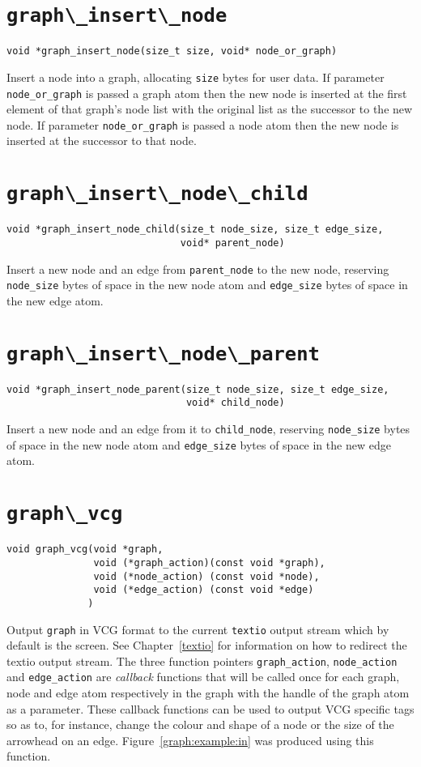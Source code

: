\section{\protect\verb+graph\_insert\_node+}
\begin{verbatim}
void *graph_insert_node(size_t size, void* node_or_graph)
\end{verbatim}
Insert a node into a graph, allocating {\tt size} bytes for user data. If
parameter \verb+node_or_graph+ is passed a graph atom then the new node is
inserted at the first element of that graph's node list with the original
list as the successor to the new node. If parameter \verb+node_or_graph+
is passed a node atom then the new node is inserted at the successor to
that node.

\section{\protect\verb+graph\_insert\_node\_child+}
\begin{verbatim}
void *graph_insert_node_child(size_t node_size, size_t edge_size, 
                              void* parent_node)
\end{verbatim}
Insert a new node and an edge from \verb+parent_node+ to the new node, reserving
\verb+node_size+ bytes of space in the new node atom and \verb+edge_size+ bytes of space
in the new edge atom.

\section{\protect\verb+graph\_insert\_node\_parent+}
\begin{verbatim}
void *graph_insert_node_parent(size_t node_size, size_t edge_size, 
                               void* child_node)
\end{verbatim}
Insert a new node and an edge from it to \verb+child_node+, reserving
\verb+node_size+ bytes of space in the new node atom and \verb+edge_size+ bytes of space
in the new edge atom.


\section{\protect\verb+graph\_vcg+}
\begin{verbatim}
void graph_vcg(void *graph,
               void (*graph_action)(const void *graph), 
               void (*node_action) (const void *node),
               void (*edge_action) (const void *edge)
              )
\end{verbatim}
Output {\tt graph} in VCG format to the current {\tt textio} output
stream which by default is the screen. See Chapter~\ref{textio} for
information on how to redirect the textio output stream. The three
function pointers \verb+graph_action+, \verb+node_action+ and
\verb+edge_action+ are {\em callback} functions that will be called once
for each graph, node and edge atom respectively in the graph with the
handle of the graph atom as a parameter. These callback functions can be
used to output VCG specific tags so as to, for instance, change the
colour and shape of a node or the size of the arrowhead on an edge.
Figure~\ref{graph:example:in} was produced using this function.


